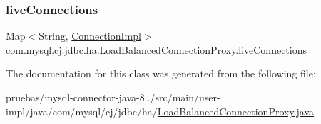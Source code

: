 \subsubsection{\texorpdfstring{live\+Connections}{liveConnections}}
{\footnotesize\ttfamily Map$<$String, \mbox{\hyperlink{classcom_1_1mysql_1_1cj_1_1jdbc_1_1_connection_impl}{Connection\+Impl}}$>$ com.\+mysql.\+cj.\+jdbc.\+ha.\+Load\+Balanced\+Connection\+Proxy.\+live\+Connections\hspace{0.3cm}{\ttfamily [protected]}}



The documentation for this class was generated from the following file\+:\begin{DoxyCompactItemize}
\item 
pruebas/mysql-\/connector-\/java-\/8../src/main/user-\/impl/java/com/mysql/cj/jdbc/ha/\mbox{\hyperlink{_load_balanced_connection_proxy_8java}{Load\+Balanced\+Connection\+Proxy.\+java}}\end{DoxyCompactItemize}
